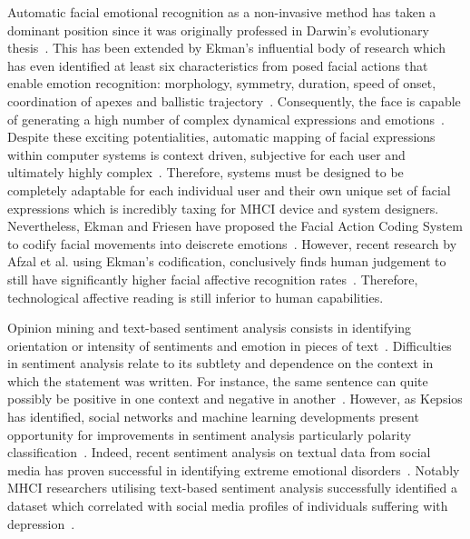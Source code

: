 \documentclass{sigchi}
\begin{document}
Automatic facial emotional recognition as a non-invasive method has taken a dominant position since it was originally professed in Darwin’s evolutionary thesis~\cite{hess2009darwin}. This has been extended by Ekman’s influential body of research which has even identified at least six characteristics from posed facial actions that enable emotion recognition: morphology, symmetry, duration, speed of onset, coordination of apexes and ballistic trajectory~\cite{ekman1992facial, keltner2003facial}. Consequently, the face is capable of generating a high number of complex dynamical expressions and emotions~\cite{donato1999classifying}. Despite these exciting potentialities, automatic mapping of facial expressions within computer systems is context driven, subjective for each user and ultimately highly complex~\cite{bartlett1999measuring, tian2005facial}. Therefore, systems must be designed to be completely adaptable for each individual user and their own unique set of facial expressions which is incredibly taxing for MHCI device and system designers. Nevertheless, Ekman and Friesen have proposed the Facial Action Coding System to codify facial movements into deiscrete emotions~\cite{cohn2007observer}. However, recent research by Afzal et al. using Ekman’s codification, conclusively finds human judgement to still have significantly higher facial affective recognition rates~\cite{afzal2009perception}. Therefore, technological affective reading is still inferior to human capabilities.  

Opinion mining and text-based sentiment analysis consists in identifying orientation or intensity of sentiments and emotion in pieces of text~\cite{nicolaou2012output}. Difficulties in sentiment analysis relate to its subtlety and dependence on the context in which the statement was written. For instance, the same sentence can quite possibly be positive in one context and negative in another~\cite{marechal2019survey}. However, as Kepsios has identified, social networks and machine learning developments present opportunity for improvements in sentiment analysis particularly polarity classification~\cite{trigeorgis2016adieu}. Indeed, recent sentiment analysis on textual data from social media has proven successful in identifying extreme emotional disorders~\cite{sharma2019automated}. Notably MHCI researchers utilising text-based sentiment analysis successfully identified a dataset which correlated with social media profiles of individuals suffering with depression~\cite{de2013predicting}.
\end{document}
